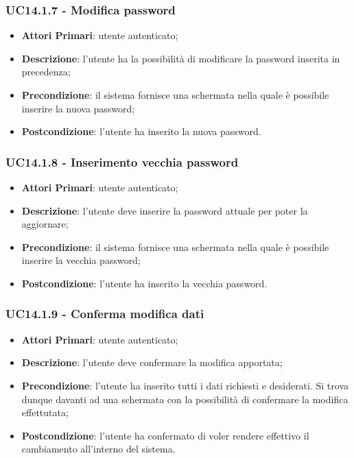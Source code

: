 \subsubsection{UC14.1.7 - Modifica password}
\begin{itemize}
	\item \textbf{Attori Primari}: utente autenticato;
	\item \textbf{Descrizione}: l'utente ha la possibilità di modificare la password inserita in precedenza;
	\item \textbf{Precondizione}: il sistema fornisce una schermata nella quale è possibile inserire la nuova password;
	\item \textbf{Postcondizione}: l'utente ha inserito la nuova password.
\end{itemize}

\subsubsection{UC14.1.8 - Inserimento vecchia password}
\begin{itemize}
	\item \textbf{Attori Primari}: utente autenticato;
	\item \textbf{Descrizione}: l'utente deve inserire la password attuale per poter la aggiornare;
	\item \textbf{Precondizione}: il sistema fornisce una schermata nella quale è possibile inserire la vecchia password;
	\item \textbf{Postcondizione}: l'utente ha inserito la vecchia password.
\end{itemize}

\subsubsection{UC14.1.9 - Conferma modifica dati}
\begin{itemize}
	\item \textbf{Attori Primari}: utente autenticato;
	\item \textbf{Descrizione}: l'utente deve 
	confermare la modifica apportata;
	\item \textbf{Precondizione}: l'utente ha inserito tutti i dati richiesti e desiderati. Si trova dunque davanti ad una schermata con la possibilità di confermare la modifica effettutata;
	\item \textbf{Postcondizione}: l'utente ha confermato di voler rendere effettivo il cambiamento all'interno del sistema.
\end{itemize}

